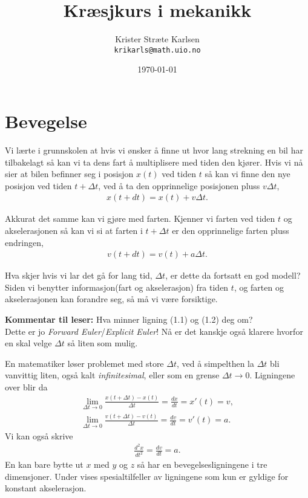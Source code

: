 \documentclass[11pt,a4paper]{article}
\title{Kræsjkurs i mekanikk }
\author{Krister Stræte Karlsen \\ 
\small\texttt{krikarls@math.uio.no}}
\date{\today}
\numberwithin{equation}{section}
\begin{document}
\maketitle

\section{Bevegelse}

Vi lærte i grunnskolen at hvis vi ønsker å finne ut hvor lang strekning en bil har tilbakelagt så kan vi ta dens fart å multiplisere med tiden den kjører. Hvis vi nå sier at bilen befinner seg i posisjon $x(t)$ ved tiden $t$ så kan vi finne den nye posisjon ved tiden $t+\Delta t$, ved å ta den opprinnelige posisjonen pluss $v \Delta t$,
\begin{align}
x(t+dt)=x(t)+v\Delta t.
\end{align}

Akkurat det samme kan vi gjøre med farten. Kjenner vi farten ved tiden $t$ og akselerasjonen så kan vi si at farten i $t+ \Delta t$ er den opprinnelige farten pluss endringen,
\begin{align}
v(t+dt)=v(t)+a\Delta t.
\end{align}

Hva skjer hvis vi lar det gå for lang tid, $\Delta t$, er dette da fortsatt en god modell? Siden vi benytter informasjon(fart og akselerasjon) fra tiden $t$, og farten og akselerasjonen kan forandre seg, så må vi være forsiktige. 

\begin{tcolorbox}
\textbf{Kommentar til leser:} Hva minner ligning (1.1) og (1.2) deg om? \\
Dette er jo \emph{Forward Euler}/\emph{Explicit Euler}! Nå er det kanskje også klarere hvorfor en skal velge $\Delta t$ så liten som mulig. 
\end{tcolorbox}

En matematiker løser problemet med store $\Delta t$, ved å simpelthen la $\Delta t$ bli vanvittig liten, også kalt \emph{infinitesimal}, eller som en grense $\Delta t \to 0$. Ligningene over blir da
\begin{align}
\lim_{\Delta t \to 0} \frac{x(t+\Delta t)-x(t)}{\Delta t} = \frac{dx}{dt} =x'(t) = v, \\
\lim_{\Delta t \to 0} \frac{v(t+\Delta t)-v(t)}{\Delta t} = \frac{dv}{dt} =v'(t) = a.
\end{align}
Vi kan også skrive 
\begin{align*}
\frac{d^2x}{dt^2}=\frac{dv}{dt}=a.
\end{align*}
En kan bare bytte ut $x$ med $y$ og $z$ så har en bevegelsesligningene i tre dimensjoner. Under vises  spesialtilfeller av ligningene som kun er gyldige for konstant akselerasjon.
\end{document}
